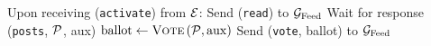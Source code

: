 \begin{algorithm}[H]
  \caption{$\honeststr\left(\textsc{Vote}\right)$}
  \label{alg:honest}
  \begin{algorithmic}[1]
    \State Upon receiving (\texttt{activate}) from $\mathcal{E}$:
    \Indent
      \State Send (\texttt{read}) to $\mathcal{G}_{\mathrm{Feed}}$
      \State Wait for response (\texttt{posts}, $\mathcal{P}$, aux)
      \State $\mathrm{ballot} \gets \textsc{Vote}\left(\mathcal{P},
      \mathrm{aux}\right)$
      \State Send (\texttt{vote}, ballot) to $\mathcal{G}_{\mathrm{Feed}}$
    \EndIndent
  \end{algorithmic}
\end{algorithm}
